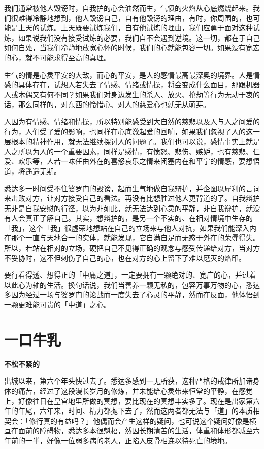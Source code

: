 \documentclass[twoside,openany]{book}
\newcommand{\mt}[1]{\textbullet \textbf{#1}}
\begin{document}
我们通常被他人毁谤时，自我护的心会油然而生，气愤的火焰从心底燃烧起来。我们很难得冷静地想到，他人毁谤自己，自有他毁谤的理由，有时，你周围的，也可能是上天的试炼。上天既要试炼我们，自有他试炼的理由，我们应勇于面对这种试炼，如果说我们没有接受试炼的必要，我们自不会遇到逆境。这一切，都在于自己如何自处，当我们冷静地放宽心怀的时候，我们的心就能包容一切。如果没有宽宏的心，就不可能求得至高的真理。

生气的情是心灵平安的大敌，而心的平安，是人的感情最高最深奥的境界。人是情感的具体存在，试想人若失去了情感、情绪或情操，将会变成什么面目，那跟机器人或木偶又有何不同？如果我们对身边发生的杀人、放火、抢劫等行为无动于衷的话，那么同样的，对东西的怜惜心、对人的慈爱心也就无从萌芽。

人因为有情感、情绪和情操，所以特别能感受到大自然的慈悲以及人与人之间爱的行为，人们受了爱的影响，也同样在心底激起爱的回响，如果我们忽视了人的这一层根本的精神作用，就无法继续探讨人的问题了。我们也可以说，感情事实上就是人之所以为人的一个重要因素，同样是感情，有愤怒、悲伤、嫉妒，也有慈悲、仁爱、欢乐等，人若一味任由外在的喜怒哀乐之情来闭塞内在和平宁的情感，要想悟道，将遥遥无期。

悉达多一时间受不住婆罗门的毁谤，起而生气地做自我辩护，并企图以犀利的言词来击败对方，让对方接受自己的看法。再没有比想胜过他人更背道的了。自我辩护无非是自我安慰的行径，以为非如此，就无法达到心灵的平静，非自我辩护，就没有人会真正了解自己。其实，想辩护的，是另一个不实的、在相对情境中生存的「我」，这个「我」很虚荣地想站在自己的立场来与他人对抗，如果我们能深入内在那个一直与天地合一的实体，就能发现，它自满自足而无惑于外在的荣辱得失。所以，若站在相对的立场，硬把自己不见得正确的观念与感受传递给对方，当对方不妥协时，这不但刺伤了自己的心，也在对方的心上留下了难以磨灭的烙印。

要行看得透、想得正的「中庸之道」，一定要拥有一颗绝对的、宽广的心，并过着以此心为轴的生活。换句话说，我们当善养一颗无私的，包容万事万物的心，悉达多因为经过一场与婆罗门的论战而一度失去了心灵的平静，然而在反面，他体悟到一颗更难能可贵的「中道」之心。

\section{一口牛乳}\label{sec1.9}

\mt{不松不紧的}

出城以来，第六个年头快过去了。悉达多感到一无所获，这种严格的戒律所加诸身体的痛苦，经过了这段漫长岁月的修炼，并未能给心灵带来恒常的平静，在感觉上，好像往日在皇宫地里所做的冥想，要比现在的冥想丰实多了。现在是出家第六年的年尾，六年来，时间、精力都抛下去了，然而这两者都无法与「道」的本质相契会：「修行真的有益吗？」他偶而会产生这样的疑问，也可说这个疑问好像是横亘在面前的障碍物，悉达多本很魁梧，然因长期清苦的生活，体重和体形都减至六年前的一半，好像一位弱多病的老人，正陷入皮骨相连以待死亡的境地。
\end{document}

